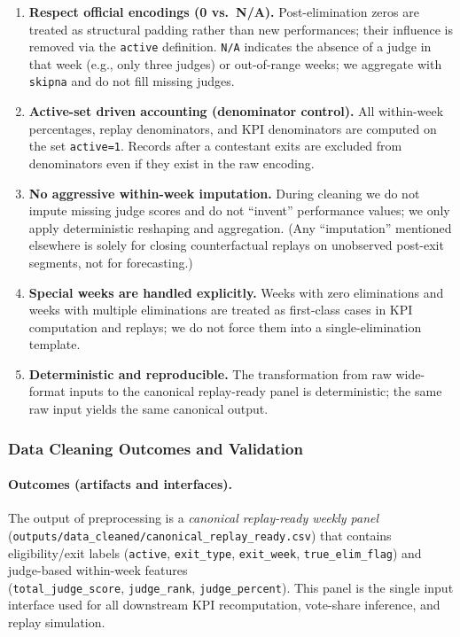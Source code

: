 \begin{enumerate}
  \item \textbf{Respect official encodings (0 vs.\ N/A).}
  Post-elimination zeros are treated as structural padding rather than new performances; their influence is removed via the \texttt{active} definition.
  \texttt{N/A} indicates the absence of a judge in that week (e.g., only three judges) or out-of-range weeks; we aggregate with \texttt{skipna} and do not fill missing judges.

  \item \textbf{Active-set driven accounting (denominator control).}
  All within-week percentages, replay denominators, and KPI denominators are computed on the set \texttt{active=1}.
  Records after a contestant exits are excluded from denominators even if they exist in the raw encoding.

  \item \textbf{No aggressive within-week imputation.}
  During cleaning we do not impute missing judge scores and do not ``invent'' performance values; we only apply deterministic reshaping and aggregation.
  (Any ``imputation'' mentioned elsewhere is solely for closing counterfactual replays on unobserved post-exit segments, not for forecasting.)

  \item \textbf{Special weeks are handled explicitly.}
  Weeks with zero eliminations and weeks with multiple eliminations are treated as first-class cases in KPI computation and replays;
  we do not force them into a single-elimination template.

  \item \textbf{Deterministic and reproducible.}
  The transformation from raw wide-format inputs to the canonical replay-ready panel is deterministic; the same raw input yields the same canonical output.
\end{enumerate}


\subsubsection{Data Cleaning Outcomes and Validation}
\label{subsubsec:cleaning_outcomes_validation}

\paragraph{Outcomes (artifacts and interfaces).}
The output of preprocessing is a \emph{canonical replay-ready weekly panel}
(\texttt{outputs/data\_cleaned/canonical\_replay\_ready.csv}) that contains eligibility/exit labels
(\texttt{active}, \texttt{exit\_type}, \texttt{exit\_week}, \texttt{true\_elim\_flag}) and judge-based within-week features\\
(\texttt{total\_judge\_score}, \texttt{judge\_rank}, \texttt{judge\_percent}).
This panel is the single input interface used for all downstream KPI recomputation, vote-share inference, and replay simulation.

